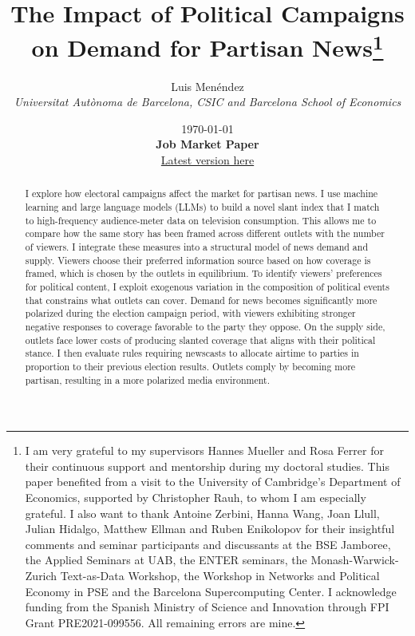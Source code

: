 \documentclass[12pt]{article}
\title{The Impact of Political Campaigns on Demand for Partisan News\thanks{I am very grateful to my supervisors Hannes Mueller and Rosa Ferrer for their continuous support and mentorship during my doctoral studies. This paper benefited from a visit to the University of Cambridge’s Department of Economics, supported by Christopher Rauh, to whom I am especially grateful. I also want to thank Antoine Zerbini,  Hanna Wang, Joan Llull, Julian Hidalgo, Matthew Ellman and Ruben Enikolopov for their insightful comments and seminar participants and discussants at the BSE Jamboree, the Applied Seminars at UAB, the ENTER seminars, the Monash-Warwick-Zurich Text-as-Data Workshop, the Workshop in Networks and Political Economy in PSE and the Barcelona Supercomputing Center. I acknowledge funding from the Spanish Ministry of Science and Innovation through FPI Grant PRE2021-099556. All remaining errors are mine.}}
\author{Luis  Menéndez \\
	\textit{\small Universitat Autònoma de Barcelona, CSIC and Barcelona School of Economics}
} %
\date{%
	\today\\[0.2ex]
	{\bfseries Job Market Paper}\\[0.2ex]
	{\normalsize\href{https://www.dropbox.com/scl/fi/f3546vufz11vj5r63xml4/elections_draft.pdf?rlkey=exjw9vm3sasahlb54ohjf2tyx\&e=1\&dl=0}{Latest version here}}
}
\renewcommand\thepart{}      %
\renewcommand\partname{}      %
\begin{document}
	
\renewcommand\thepart{}      %
\renewcommand\partname{}      %

	
	\maketitle
	\enlargethispage{2\baselineskip}
	
	
	\vspace{-1cm}
	
	
	\begin{abstract}
		



I explore how electoral campaigns affect the market for partisan news. I use machine learning and large language models (LLMs) to build a novel slant index that I match to high-frequency audience-meter data on television consumption. This allows me to compare how the same story has been framed across different outlets with the number of viewers. I integrate these measures into a structural model of news demand and supply. Viewers choose their preferred information source based on how coverage is framed, which is chosen by the outlets in equilibrium. To identify viewers’ preferences for political content, I exploit exogenous variation in the composition of political events that constrains what outlets can cover. Demand for news becomes significantly more polarized during the election campaign period, with viewers exhibiting stronger negative responses to coverage favorable to the party they oppose. On the supply side, outlets face lower costs of producing slanted coverage that aligns with their political stance. I then evaluate rules requiring newscasts to allocate airtime to parties in proportion to their previous election results. Outlets comply by becoming more partisan, resulting in a more polarized media environment.







\end{abstract}
\end{document}
